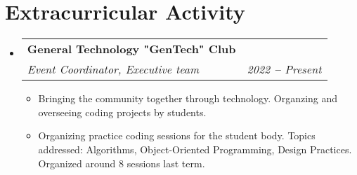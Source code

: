 \documentclass[letterpaper,11pt]{article}
\makeatletter
\newcommand{\resumeItem}[1]{
  \item\small{
    {#1 \vspace{-2pt}}
  }
}
\newcommand{\resumeSubheading}[4]{
  \vspace{-2pt}\item
    \begin{tabular*}{0.97\textwidth}[t]{l@{\extracolsep{\fill}}r}
      \textbf{#1} & #2 \\
      \textit{\small#3} & \textit{\small #4} \\
    \end{tabular*}\vspace{-7pt}
}
\newcommand{\resumeSubHeadingListStart}{\begin{itemize}[leftmargin=0.15in, label={}]}
\newcommand{\resumeSubHeadingListEnd}{\end{itemize}}
\newcommand{\resumeItemListStart}{\begin{itemize}}
\newcommand{\resumeItemListEnd}{\end{itemize}\vspace{-5pt}}
\makeatother
\begin{document}

    \section{Extracurricular Activity}
        \vspace{2pt}
          \resumeSubHeadingListStart
      
          \resumeSubheading
          {General Technology "GenTech" Club}{}
          {Event Coordinator, Executive team}{2022 \textbf{--} Present}
            \resumeItemListStart
                \resumeItem{Bringing the community together through technology. Organzing and overseeing coding projects by students.}
                \resumeItem{Organizing practice coding sessions for the student body. Topics addressed: Algorithms, Object-Oriented Programming, Design Practices. Organized around 8 sessions last term.}
            \resumeItemListEnd
          

    
  \resumeSubHeadingListEnd








    
\end{document}

